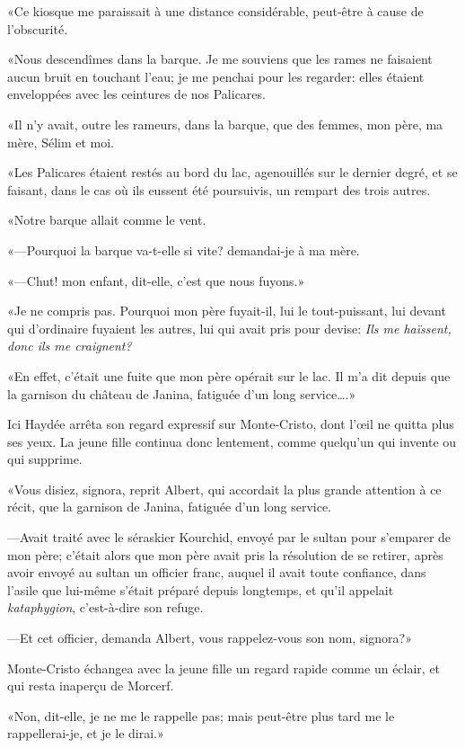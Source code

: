 «Ce kiosque me paraissait à une distance considérable, peut-être à cause de l'obscurité. 

«Nous descendîmes dans la barque. Je me souviens que les rames ne faisaient aucun bruit en touchant l'eau; je me penchai pour les regarder: elles étaient enveloppées avec les ceintures de nos Palicares. 

«Il n'y avait, outre les rameurs, dans la barque, que des femmes, mon père, ma mère, Sélim et moi. 

«Les Palicares étaient restés au bord du lac, agenouillés sur le dernier degré, et se faisant, dans le cas où ils eussent été poursuivis, un rempart des trois autres. 

«Notre barque allait comme le vent. 

«—Pourquoi la barque va-t-elle si vite? demandai-je à ma mère. 

«—Chut! mon enfant, dit-elle, c'est que nous fuyons.» 

«Je ne compris pas. Pourquoi mon père fuyait-il, lui le tout-puissant, lui devant qui d'ordinaire fuyaient les autres, lui qui avait pris pour devise: \textit{Ils me haïssent, donc ils me craignent?}  

«En effet, c'était une fuite que mon père opérait sur le lac. Il m'a dit depuis que la garnison du château de Janina, fatiguée d'un long service\dots.» 

Ici Haydée arrêta son regard expressif sur Monte-Cristo, dont l'œil ne quitta plus ses yeux. La jeune fille continua donc lentement, comme quelqu'un qui invente ou qui supprime. 

«Vous disiez, signora, reprit Albert, qui accordait la plus grande attention à ce récit, que la garnison de Janina, fatiguée d'un long service. 

—Avait traité avec le séraskier Kourchid, envoyé par le sultan pour s'emparer de mon père; c'était alors que mon père avait pris la résolution de se retirer, après avoir envoyé au sultan un officier franc, auquel il avait toute confiance, dans l'asile que lui-même s'était préparé depuis longtemps, et qu'il appelait \textit{kataphygion}, c'est-à-dire son refuge. 

—Et cet officier, demanda Albert, vous rappelez-vous son nom, signora?» 

Monte-Cristo échangea avec la jeune fille un regard rapide comme un éclair, et qui resta inaperçu de Morcerf. 

«Non, dit-elle, je ne me le rappelle pas; mais peut-être plus tard me le rappellerai-je, et je le dirai.» 

